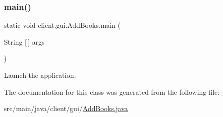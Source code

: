 \subsubsection{\texorpdfstring{main()}{main()}}
{\footnotesize\ttfamily static void client.\+gui.\+Add\+Books.\+main (\begin{DoxyParamCaption}\item[{String \mbox{[}$\,$\mbox{]}}]{args }\end{DoxyParamCaption})\hspace{0.3cm}{\ttfamily [static]}}

Launch the application. 

The documentation for this class was generated from the following file\+:\begin{DoxyCompactItemize}
\item 
src/main/java/client/gui/\hyperlink{_add_books_8java}{Add\+Books.\+java}\end{DoxyCompactItemize}

